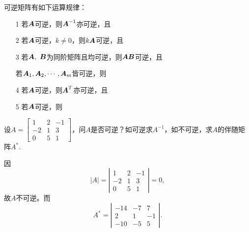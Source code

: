 \begin{frame}

\begin{dingli}可逆矩阵有如下运算规律：
  \begin{enumerate}
  \item[1] 若$\boldsymbol{A}$可逆，则$\boldsymbol{A}^{-1}$亦可逆，且
    \\[.1in]
  \item[2] 若$\boldsymbol{A}$可逆，$k\ne 0$，则$k\boldsymbol{A}$可逆，且
    \\[.1in]
  \item[3] 若$\boldsymbol{A}, ~\boldsymbol{B}$为同阶矩阵且均可逆，则$\boldsymbol{A}\boldsymbol{B}$可逆，且
    \\[.1in]
  \item[] 若$\boldsymbol{A}_1,\boldsymbol{A}_2,\cdots,\boldsymbol{A}_m$皆可逆，则
    \\[.1in]
  \item[4] 若$\boldsymbol{A}$可逆，则$\boldsymbol{A}^T$亦可逆，且
    \\[.1in]
  \item[5] 若$\boldsymbol{A}$可逆，则
    \\[.1in]
  \end{enumerate}
\end{dingli}
\end{frame}

\begin{frame}
  \begin{li}[$\bigstar$]
    设$A=\left[
      \begin{array}{rrr}
        1&2&-1\\
        -2&1&3\\
        0&5&1
      \end{array}
    \right]$，问$A$是否可逆？如可逆求$A^{-1}$，如不可逆，求$A$的伴随矩阵$A^*$.
  \end{li}
  \pause
  \begin{jie}
    因$$|A|=\left|
      \begin{array}{rrr}
        1&2&-1\\
        -2&1&3\\
        0&5&1
      \end{array}
    \right|=0,$$
    故$A$不可逆。而
    $$A^*=\left|
      \begin{array}{rrr}
        -14&-7&7\\
        2&1&-1\\
        -10&-5&5
      \end{array}
    \right|.$$
  \end{jie}
\end{frame}


